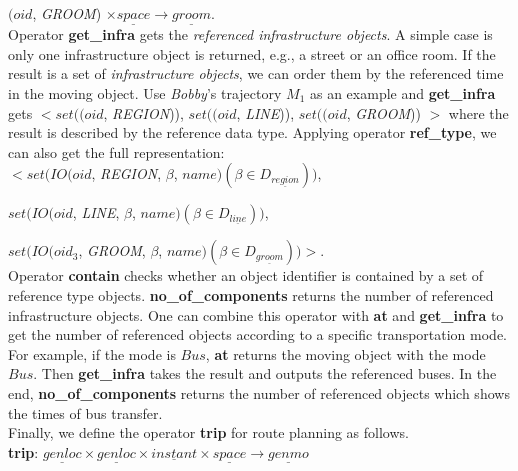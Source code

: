 $(oid$, \textit{GROOM}) $\times \underline{space} \rightarrow \underline{groom}$. \\

Operator \textbf{get\_infra} gets the \textit{referenced infrastructure objects}. A simple case is only one infrastructure object is returned, e.g., a street or an office room. If the result is a set of \textit{infrastructure objects}, we can order them by the referenced time in the moving object. Use \textit{Bobby}'s trajectory $M_1$ as an example and \textbf{get\_infra} gets $<set((oid$, \textit{REGION})), $set((oid$, \textit{LINE})), $set((oid$, \textit{GROOM})) $>$ where the result is described by the reference data type. Applying operator \textbf{ref\_type}, 
we can also get the full representation: \\

$<set(IO(oid$, \textit{REGION}, $\beta$, $name)(\beta \in D_{\underline{region}}))$,  

\hspace{0.25cm} $set(IO(oid$, \textit{LINE}, $\beta$, $name)(\beta \in D_{\underline{line}}))$, 

\hspace{0.25cm} $set(IO(oid_3$, \textit{GROOM}, $\beta$, $name)(\beta \in D_{\underline{groom}}))>$. \\

Operator \textbf{contain} checks whether an object identifier is contained by a set of reference type objects. \textbf{no\_of\_components} returns the number of referenced infrastructure objects. One can combine this operator with \textbf{at} and \textbf{get\_infra} to get the number of referenced objects according to a specific transportation mode. For example, if the mode is $Bus$, \textbf{at} returns the moving object with the mode $Bus$. Then \textbf{get\_infra} takes the result and outputs the referenced buses. In the end, \textbf{no\_of\_components} returns the number of referenced objects which shows the times of bus transfer. \\

Finally, we define the operator \textbf{trip} for route planning as follows. \\

\textbf{trip}: $\underline{genloc} \times \underline{genloc} \times \underline{instant} \times \underline{space} \rightarrow \underline{genmo}$  \\

